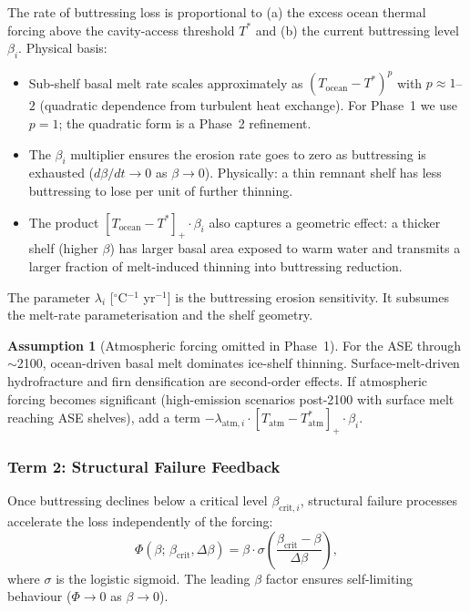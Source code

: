 \documentclass[11pt]{article}
\theoremstyle{definition}
\newtheorem{assumption}{Assumption}
\begin{document}
The rate of buttressing loss is proportional to (a) the excess ocean thermal forcing above the cavity-access threshold $T^{*}$ and (b) the current buttressing level $\beta_i$.  Physical basis:
\begin{itemize}
  \item Sub-shelf basal melt rate scales approximately as $(T_{\text{ocean}} - T^{*})^p$ with $p \approx 1$--$2$ (quadratic dependence from turbulent heat exchange).  For Phase~1 we use $p = 1$; the quadratic form is a Phase~2 refinement.
  \item The $\beta_i$ multiplier ensures the erosion rate goes to zero as buttressing is exhausted ($d\beta/dt \to 0$ as $\beta \to 0$).  Physically: a thin remnant shelf has less buttressing to lose per unit of further thinning.
  \item The product $[T_{\text{ocean}} - T^{*}]_+ \cdot \beta_i$ also captures a geometric effect: a thicker shelf (higher $\beta$) has larger basal area exposed to warm water and transmits a larger fraction of melt-induced thinning into buttressing reduction.
\end{itemize}

The parameter $\lambda_i$ [${}^\circ$C$^{-1}$ yr$^{-1}$] is the buttressing erosion sensitivity.  It subsumes the melt-rate parameterisation and the shelf geometry.

\begin{assumption}[Atmospheric forcing omitted in Phase~1]
  \label{assump:no_atm}
  For the ASE through $\sim$2100, ocean-driven basal melt dominates ice-shelf thinning.  Surface-melt-driven hydrofracture and firn densification are second-order effects.  If atmospheric forcing becomes significant (high-emission scenarios post-2100 with surface melt reaching ASE shelves), add a term $-\lambda_{\text{atm},i} \cdot [T_{\text{atm}} - T_{\text{atm}}^*]_+ \cdot \beta_i$.
\end{assumption}

\subsubsection{Term 2: Structural Failure Feedback}
\label{sec:structural_failure}

Once buttressing declines below a critical level $\beta_{\text{crit},i}$, structural failure processes accelerate the loss independently of the forcing:
\begin{equation}
  \Phi(\beta;\, \beta_{\text{crit}}, \Delta\beta) = \beta \cdot \sigma\!\left(\frac{\beta_{\text{crit}} - \beta}{\Delta\beta}\right),
  \label{eq:Phi_struct}
\end{equation}
where $\sigma$ is the logistic sigmoid.  The leading $\beta$ factor ensures self-limiting behaviour ($\Phi \to 0$ as $\beta \to 0$).
\end{document}
